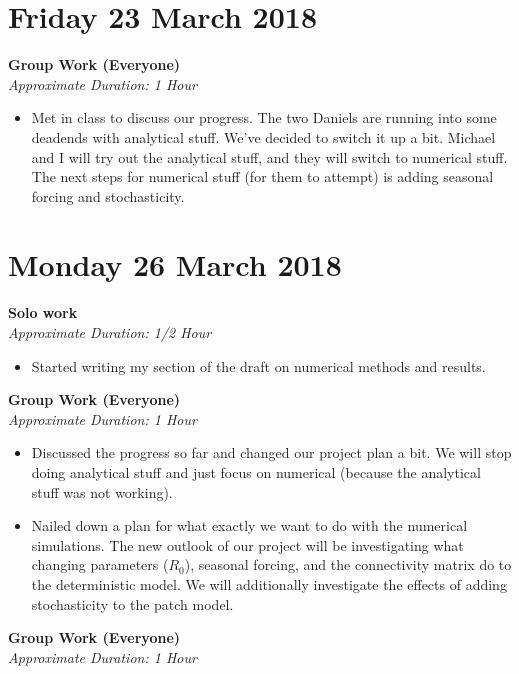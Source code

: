 \documentclass[12pt]{article}\usepackage[]{graphicx}\usepackage[]{color}
\begin{document}
\begin{itemize}
\section*{Friday 23 March 2018}

\textbf{Group Work (Everyone)} \\
\emph{Approximate Duration: 1 Hour}

\begin{itemize}
\item Met in class to discuss our progress. The two Daniels are running into some deadends with analytical stuff. We've decided to switch it up a bit.  Michael and I will try out the analytical stuff, and they will switch to numerical stuff. The next steps for numerical stuff (for them to attempt) is adding seasonal forcing and stochasticity.
\end{itemize}

\section*{Monday 26 March 2018}

\textbf{Solo work} \\
\emph{Approximate Duration: 1/2 Hour} 

\begin{itemize}
\item Started writing my section of the draft on numerical methods and results.
\end{itemize}

\textbf{Group Work (Everyone)} \\
\emph{Approximate Duration: 1 Hour}

\begin{itemize}
\item Discussed the progress so far and changed our project plan a bit. We will stop doing analytical stuff and just focus on numerical (because the analytical stuff was not working).
\item Nailed down a plan for what exactly we want to do with the numerical simulations. The new outlook of our project will be investigating what changing parameters ($R_0$), seasonal forcing, and the connectivity matrix do to the deterministic model. We will additionally investigate the effects of adding stochasticity to the patch model.
\end{itemize}

\textbf{Group Work (Everyone)} \\
\emph{Approximate Duration: 1 Hour}


\end{itemize}
\end{document}
